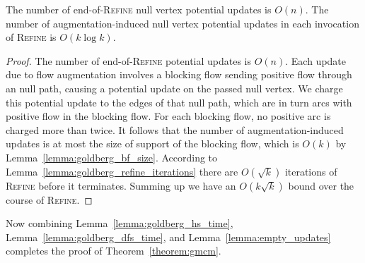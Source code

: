 \documentclass[a4paper,UKenglish]{socg-lipics-v2018}
\def\polylog{\mathop{\mathrm{polylog}}}
\theoremstyle{plain}
\numberwithin{figure}{section}
\begin{document}
\begin{toappendix}
\begin{lemmarep}
\label{lemma:empty_updates}
The number of end-of-\textsc{Refine} null vertex potential updates is $O(n)$.
The number of augmentation-induced null vertex potential updates in each
invocation of \textsc{Refine} is $O(k\log k)$.
\end{lemmarep}

\begin{proof}
The number of end-of-\textsc{Refine} potential updates is $O(n)$.
Each update due to flow augmentation involves a blocking flow sending positive
flow through an null path, causing a potential update on the passed
null vertex.
We charge this potential update to the edges of that null path, which are in
turn arcs with positive flow in the blocking flow.
For each blocking flow, no positive arc is charged more than twice.
It follows that the number of augmentation-induced updates is at most the size of support of the blocking flow, which is $O(k)$
by Lemma~\ref{lemma:goldberg_bf_size}.
According to Lemma~\ref{lemma:goldberg_refine_iterations} there are $O(\sqrt{k})$ iterations of \textsc{Refine} before it terminates.
Summing up we have an $O(k\sqrt{k})$ bound over the course of \textsc{Refine}.
\end{proof}


%
Now combining Lemma~\ref{lemma:goldberg_hs_time}, Lemma~\ref{lemma:goldberg_dfs_time}, and
Lemma~\ref{lemma:empty_updates}
completes the proof of Theorem~\ref{theorem:gmcm}.

\end{toappendix}
\end{document}
